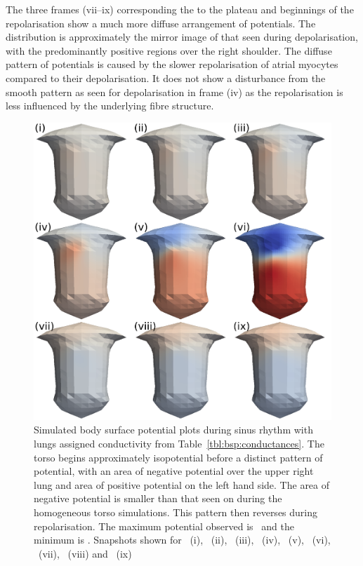 The three frames (vii--ix) corresponding the to the plateau and beginnings of the
repolarisation show a much more diffuse arrangement of potentials.
The distribution is approximately the mirror image of that seen during
depolarisation, with the predominantly positive regions over the right shoulder.
The diffuse pattern of potentials is caused by the slower repolarisation of
atrial myocytes compared to their depolarisation.
It does not show a disturbance from the smooth pattern as seen for
depolarisation in frame (iv) as the repolarisation is less influenced by the
underlying fibre structure.


\begin{figure}
\includegraphics{figures/bsp/bsp_lungs}
\caption[Body Surface Potential snapshots, with lungs]{
\label{bsp:fig:lungs_bsp}
Simulated body surface potential plots during sinus rhythm with lungs assigned
conductivity from Table~\ref{tbl:bsp:conductances}.
The torso begins approximately isopotential before a distinct pattern of
potential, with an area of negative potential over the upper right lung and
area of positive potential on the left hand side.
The area of negative potential is smaller than that seen on during the
homogeneous torso simulations.
This pattern then reverses during repolarisation.
The maximum potential observed is \ and the minimum is .
Snapshots shown for \ (i), \ (ii), \ (iii), \ (iv),
\ (v), \ (vi), \ (vii), \ (viii) and \
(ix)
}
\end{figure}


